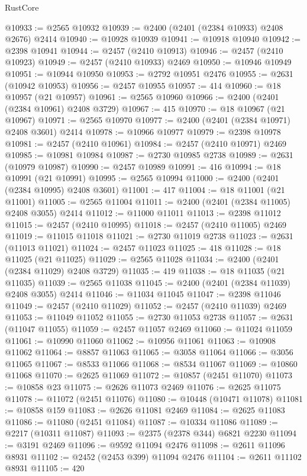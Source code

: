 \begin{lexlean}{RustCore}
\begin{coremodule}
@10933 := @2565 @10932
@10939 := @2400 (@2401 (@2384 @10933) @2408 @2676) @2414
@10940 := @10928 @10939
@10941 := @10918 @10940
@10942 := @2398 @10941
@10944 := @2457 (@2410 @10913)
@10946 := @2457 (@2410 @10923)
@10949 := @2457 (@2410 @10933) @2469
@10950 := @10946 @10949
@10951 := @10944 @10950
@10953 := @2792 @10951 @2476
@10955 := @2631 (@10942 @10953)
@10956 := @2457 @10955
@10957 := 414
@10960 := @18 @10957 (@21 @10957)
@10961 := @2565 @10960
@10966 := @2400 (@2401 (@2384 @10961) @2408 @3729)
@10967 := 415
@10970 := @18 @10967 (@21 @10967)
@10971 := @2565 @10970
@10977 := @2400 (@2401 (@2384 @10971) @2408 @3601) @2414
@10978 := @10966 @10977
@10979 := @2398 @10978
@10981 := @2457 (@2410 @10961)
@10984 := @2457 (@2410 @10971) @2469
@10985 := @10981 @10984
@10987 := @2730 @10985 @2738
@10989 := @2631 (@10979 @10987)
@10990 := @2457 @10989
@10991 := 416
@10994 := @18 @10991 (@21 @10991)
@10995 := @2565 @10994
@11000 := @2400 (@2401 (@2384 @10995) @2408 @3601)
@11001 := 417
@11004 := @18 @11001 (@21 @11001)
@11005 := @2565 @11004
@11011 := @2400 (@2401 (@2384 @11005) @2408 @3055) @2414
@11012 := @11000 @11011
@11013 := @2398 @11012
@11015 := @2457 (@2410 @10995)
@11018 := @2457 (@2410 @11005) @2469
@11019 := @11015 @11018
@11021 := @2730 @11019 @2738
@11023 := @2631 (@11013 @11021)
@11024 := @2457 @11023
@11025 := 418
@11028 := @18 @11025 (@21 @11025)
@11029 := @2565 @11028
@11034 := @2400 (@2401 (@2384 @11029) @2408 @3729)
@11035 := 419
@11038 := @18 @11035 (@21 @11035)
@11039 := @2565 @11038
@11045 := @2400 (@2401 (@2384 @11039) @2408 @3055) @2414
@11046 := @11034 @11045
@11047 := @2398 @11046
@11049 := @2457 (@2410 @11029)
@11052 := @2457 (@2410 @11039) @2469
@11053 := @11049 @11052
@11055 := @2730 @11053 @2738
@11057 := @2631 (@11047 @11055)
@11059 := @2457 @11057 @2469
@11060 := @11024 @11059
@11061 := @10990 @11060
@11062 := @10956 @11061
@11063 := @10908 @11062
@11064 := @8857 @11063
@11065 := @3058 @11064
@11066 := @3056 @11065
@11067 := @8533 @11066
@11068 := @8534 @11067
@11069 := @10860 @11068
@11070 := @2625 @11069
@11072 := @10857 (@2451 @11070)
@11073 := @10858 @23
@11075 := @2626 @11073 @2469
@11076 := @2625 @11075
@11078 := @11072 (@2451 @11076)
@11080 := @10448 (@10471 @11078)
@11081 := @10858 @159
@11083 := @2626 @11081 @2469
@11084 := @2625 @11083
@11086 := @11080 (@2451 @11084)
@11087 := @10334 @11086
@11089 := @2217 (@10311 @11087)
@11093 := @2375 (@2378 @344) @6821 @2230
@11094 := @3191 @2469
@11096 := @9592 @11094 @2476
@11098 := @2611 @11096 @8931
@11102 := @2452 (@2453 @399) @11094 @2476
@11104 := @2611 @11102 @8931
@11105 := 420

\end{coremodule}
\end{lexlean}
